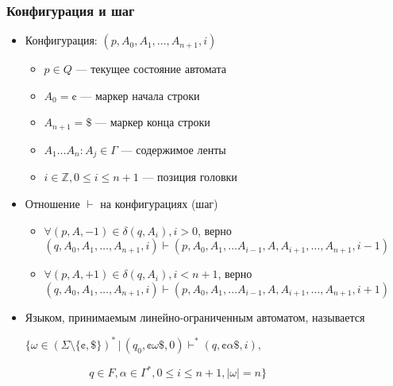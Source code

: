 \documentclass{beamer}
\begin{document}
\begin{frame}[fragile]
  \transwipe[direction=90]
  \frametitle{Конфигурация и шаг}
\begin{itemize}
  \item Конфигурация: $(p, A_0, A_1, \dots, A_{n+1}, i)$
  \begin{itemize}
  	\item $p \in Q$ --- текущее состояние автомата
  	\item $A_0 = \cent$ --- маркер начала строки
  	\item $A_{n+1} = \$ $ --- маркер конца строки
  	\item $A_1 \dots A_n: A_j \in \Gamma$ --- содержимое ленты
  	\item $i \in \mathds{Z}, 0 \leq i \leq n+1$ --- позиция головки
  \end{itemize}    
  \item Отношение $\vdash$ на конфигурациях (шаг)
  \begin{itemize}
  	\item $\forall (p, A, -1) \in \delta(q, A_i), i > 0$, верно $(q, A_0, A_1, \dots, A_{n+1}, i) \vdash (p, A_0, A_1, \dots A_{i-1}, A, A_{i+1}, \dots, A_{n+1}, i - 1)$
  	\item $\forall (p, A, +1) \in \delta(q, A_i), i < n+1$, верно $(q, A_0, A_1, \dots, A_{n+1}, i) \vdash (p, A_0, A_1, \dots A_{i-1}, A, A_{i+1}, \dots, A_{n+1}, i + 1)$
  \end{itemize}
  \item Языком, принимаемым линейно-ограниченным автоматом, называется 
  
  $\{ \omega \in (\Sigma \setminus \{ \cent, \$ \})^* \, | \, (q_0, \cent \omega \$, 0) \vdash^* (q, \cent \alpha \$, i), $
  
  $\ \ \ \ \ \ \ \ \ \ \ \ \ \ \ \ \ \ \ \ \ \ \ \ \ \ q \in F, \alpha \in \Gamma^*, 0 \leq i \leq n+1, |\omega| = n \}$
\end{itemize}

\end{frame}
\end{document}

